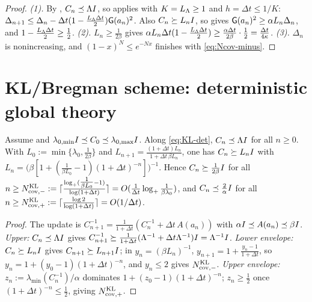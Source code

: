 \begin{proof}
\emph{(1).} By , $C_n\preceq\Lambda I$, so  applies with
$K=L_\Lambda\geq1$ and $h=\Delta t\leq1/K$:
$\Delta_{n+1}\leq\Delta_n-\Delta t(1-\tfrac{L_\Lambda\Delta t}2)\mathsf{G}(a_n)^2$. Also $C_n\succeq L_nI$,
so  gives $\mathsf{G}(a_n)^2\geq\alpha L_n\Delta_n$, and $1-\tfrac{L_\Lambda\Delta t}2\geq\tfrac12$.
\emph{(2).} $L_n\geq\tfrac1{2\beta}$ gives $\alpha L_n\Delta t(1-\tfrac{L_\Lambda\Delta t}2)\geq\tfrac{\alpha\Delta t}{2\beta}\cdot\tfrac12=\tfrac{\Delta t}{4\kappa}$.
\emph{(3).} $\Delta_n$ is nonincreasing, and $(1-x)^N\leq e^{-Nx}$ finishes with \eqref{eq:Ncov-minus}.
\end{proof}

\section{KL/Bregman scheme: deterministic global theory}
\label{sec:KL-global}

\begin{lemma}
\label{lem:KL-cov}
Assume  and $\lambda_{0,\min}I\preceq C_0\preceq\lambda_{0,\max}I$.
Along \eqref{eq:KL-det}, $C_n\preceq\Lambda I$ for all $n\geq0$. With
$L_0:=\min\{\lambda_0,\tfrac1{2\beta}\}$ and $L_{n+1}=\tfrac{(1+\Delta t)L_n}{1+\Delta t\,\beta L_n}$,
one has $C_n\succeq L_nI$ with
$L_n=\bigl(\beta[1+(\tfrac1{\beta L_0}-1)(1+\Delta t)^{-n}]\bigr)^{-1}$. Hence $C_n\succeq\tfrac1{2\beta}I$
for all
$n\geq N_{\mathrm{cov},-}^{\mathrm{KL}}:=\lceil\tfrac{\log_+(\tfrac1{\beta L_0}-1)}{\log(1+\Delta t)}\rceil
=O(\tfrac1{\Delta t}\log_+\tfrac1{\beta\lambda_0})$,
and $C_n\preceq\tfrac2\alpha I$ for all $n\geq N_{\mathrm{cov},+}^{\mathrm{KL}}:=\lceil\tfrac{\log2}{\log(1+\Delta t)}\rceil=O(1/\Delta t)$.
\end{lemma}

\begin{proof}
The update is $C_{n+1}^{-1}=\tfrac1{1+\Delta t}(C_n^{-1}+\Delta t\,A(a_n))$ with
$\alpha I\preceq A(a_n)\preceq\beta I$. \emph{Upper:} $C_n\preceq\Lambda I$ gives
$C_{n+1}^{-1}\succeq\tfrac1{1+\Delta t}(\Lambda^{-1}+\Delta t\Lambda^{-1})I=\Lambda^{-1}I$.
\emph{Lower envelope:} $C_n\succeq L_nI$ gives $C_{n+1}\succeq L_{n+1}I$; in $y_n=(\beta L_n)^{-1}$,
$y_{n+1}=1+\tfrac{y_n-1}{1+\Delta t}$, so $y_n=1+(y_0-1)(1+\Delta t)^{-n}$, and $y_n\leq2$ gives
$N_{\mathrm{cov},-}^{\mathrm{KL}}$. \emph{Upper envelope:} $z_n:=\lambda_{\min}(C_n^{-1})/\alpha$ dominates
$1+(z_0-1)(1+\Delta t)^{-n}$; $z_n\geq\tfrac12$ once $(1+\Delta t)^{-n}\leq\tfrac12$, giving $N_{\mathrm{cov},+}^{\mathrm{KL}}$.
\end{proof}

